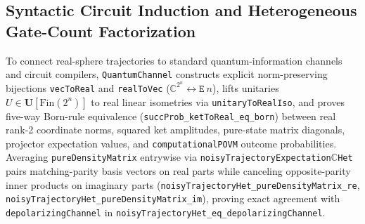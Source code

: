 \subsection{Syntactic Circuit Induction and Heterogeneous Gate-Count Factorization}
\label{sec:supp-circuit-induction}

{\setlength{\emergencystretch}{5em}%
To connect real-sphere trajectories to standard quantum-information channels and circuit compilers, \texttt{QuantumChannel} constructs explicit norm-preserving bijections \texttt{vecToReal} and \texttt{realToVec} ($\mathbb{C}^{2^n} \leftrightarrow \texttt{E}\ n$), lifts unitaries $U \in \mathbf{U}[\mathrm{Fin}(2^n)]$ to real linear isometries via \texttt{unitaryToRealIso}, and proves five-way Born-rule equivalence (\texttt{succProb\_ketToReal\_eq\_born}) between real rank-2 coordinate norms, squared ket amplitudes, pure-state matrix diagonals, projector expectation values, and \texttt{computationalPOVM} outcome probabilities. Averaging \texttt{pureDensityMatrix} entrywise via \texttt{noisyTrajectoryExpectation$\mathbb{C}$Het} pairs matching-parity basis vectors on real parts while canceling opposite-parity inner products on imaginary parts (\texttt{noisyTrajectoryHet\_pureDensityMatrix\_re}, \texttt{noisyTrajectoryHet\_pureDensityMatrix\_im}), proving exact agreement with \texttt{depolarizingChannel} in \texttt{noisyTrajectoryHet\_eq\_depolarizingChannel}.\par}

